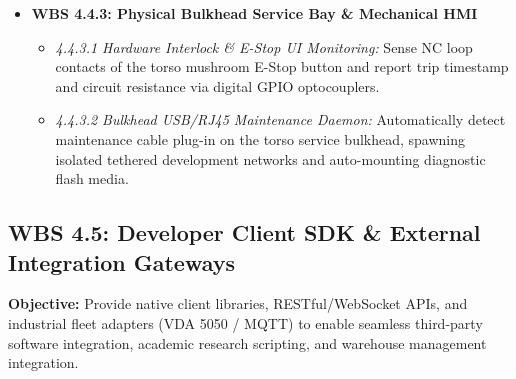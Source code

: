 \documentclass[10pt,a4paper]{article}
\begin{document}
\begin{itemize}[leftmargin=1.5em]
    \item \textbf{WBS 4.4.3: Physical Bulkhead Service Bay \& Mechanical HMI}
    \begin{itemize}[leftmargin=1.2em]
        \item \emph{4.4.3.1 Hardware Interlock \& E-Stop UI Monitoring:} Sense NC loop contacts of the torso mushroom E-Stop button and report trip timestamp and circuit resistance via digital GPIO optocouplers.
        \item \emph{4.4.3.2 Bulkhead USB/RJ45 Maintenance Daemon:} Automatically detect maintenance cable plug-in on the torso service bulkhead, spawning isolated tethered development networks and auto-mounting diagnostic flash media.
    \end{itemize}
\end{itemize}

\subsection{WBS 4.5: Developer Client SDK \& External Integration Gateways}
\textbf{Objective:} Provide native client libraries, RESTful/WebSocket APIs, and industrial fleet adapters (VDA 5050 / MQTT) to enable seamless third-party software integration, academic research scripting, and warehouse management integration.
\end{document}
